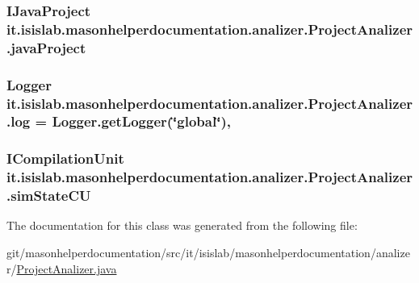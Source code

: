\hypertarget{classit_1_1isislab_1_1masonhelperdocumentation_1_1analizer_1_1_project_analizer_a8df706a1af9fdd057124a0e0d13a675d}{
\subsubsection[{java\-Project}]{\setlength{\rightskip}{0pt plus 5cm}I\-Java\-Project it.\-isislab.\-masonhelperdocumentation.\-analizer.\-Project\-Analizer.\-java\-Project\hspace{0.3cm}{\ttfamily [private]}}}\label{classit_1_1isislab_1_1masonhelperdocumentation_1_1analizer_1_1_project_analizer_a8df706a1af9fdd057124a0e0d13a675d}
\hypertarget{classit_1_1isislab_1_1masonhelperdocumentation_1_1analizer_1_1_project_analizer_a3a2698c8ab70661f2656b194d35c5dd7}{
\subsubsection[{log}]{\setlength{\rightskip}{0pt plus 5cm}Logger it.\-isislab.\-masonhelperdocumentation.\-analizer.\-Project\-Analizer.\-log = Logger.\-get\-Logger(\char`\"{}global\char`\"{})\hspace{0.3cm}{\ttfamily [static]}, {\ttfamily [private]}}}\label{classit_1_1isislab_1_1masonhelperdocumentation_1_1analizer_1_1_project_analizer_a3a2698c8ab70661f2656b194d35c5dd7}
\hypertarget{classit_1_1isislab_1_1masonhelperdocumentation_1_1analizer_1_1_project_analizer_a0fca1d0eb206f331ea5079aa3e6c9fe7}{
\subsubsection[{sim\-State\-C\-U}]{\setlength{\rightskip}{0pt plus 5cm}I\-Compilation\-Unit it.\-isislab.\-masonhelperdocumentation.\-analizer.\-Project\-Analizer.\-sim\-State\-C\-U\hspace{0.3cm}{\ttfamily [private]}}}\label{classit_1_1isislab_1_1masonhelperdocumentation_1_1analizer_1_1_project_analizer_a0fca1d0eb206f331ea5079aa3e6c9fe7}


The documentation for this class was generated from the following file\-:\begin{DoxyCompactItemize}
\item 
git/masonhelperdocumentation/src/it/isislab/masonhelperdocumentation/analizer/\hyperlink{_project_analizer_8java}{Project\-Analizer.\-java}\end{DoxyCompactItemize}
